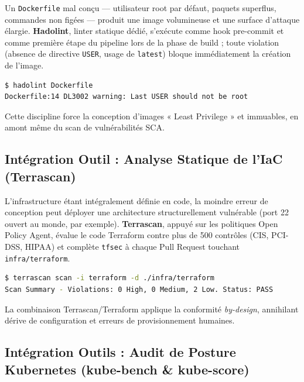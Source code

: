 Un \texttt{Dockerfile} mal conçu — utilisateur root par défaut, paquets superflus, commandes non figées — produit une image volumineuse et une surface d'attaque élargie. \textbf{Hadolint}, linter statique dédié, s'exécute comme hook pre-commit et comme première étape du pipeline lors de la phase de build ; toute violation (absence de directive \texttt{USER}, usage de \texttt{latest}) bloque immédiatement la création de l'image.

\begin{lstlisting}[language=bash, caption={Vérification du Dockerfile par Hadolint}, label={lst:hadolint_proof}]
$ hadolint Dockerfile
Dockerfile:14 DL3002 warning: Last USER should not be root
\end{lstlisting}

Cette discipline force la conception d'images « Least Privilege » et immuables, en amont même du scan de vulnérabilités SCA.

\subsection{Intégration Outil : Analyse Statique de l'IaC (Terrascan)}

L'infrastructure étant intégralement définie en code, la moindre erreur de conception peut déployer une architecture structurellement vulnérable (port 22 ouvert au monde, par exemple). \textbf{Terrascan}, appuyé sur les politiques Open Policy Agent, évalue le code Terraform contre plus de 500 contrôles (CIS, PCI-DSS, HIPAA) et complète \texttt{tfsec} à chaque Pull Request touchant \texttt{infra/terraform}.

\begin{lstlisting}[language=bash, caption={Rapport de scan Terrascan}, label={lst:terrascan_proof}]
$ terrascan scan -i terraform -d ./infra/terraform
Scan Summary - Violations: 0 High, 0 Medium, 2 Low. Status: PASS
\end{lstlisting}

La combinaison Terrascan/Terraform applique la conformité \textit{by-design}, annihilant dérive de configuration et erreurs de provisionnement humaines.

\subsection{Intégration Outils : Audit de Posture Kubernetes (kube-bench \& kube-score)}


